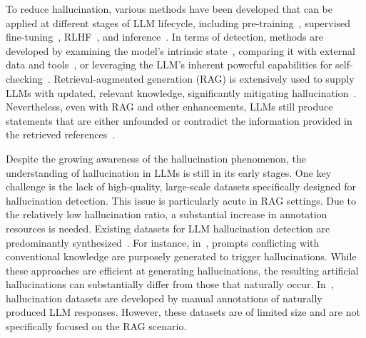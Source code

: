 \documentclass[11pt]{article}
\begin{document}



To reduce hallucination, various methods have been developed that can be applied at different stages of LLM lifecycle, including pre-training~\cite{brown2020language}, supervised fine-tuning~\cite{zhou2023lima,zhang2023r}, RLHF~\cite{ouyang2022training, lin-etal-2022-truthfulqa}, and inference~\cite{dhuliawala2023chainofverification, gao-etal-2023-rarr}. 
In terms of detection, methods are developed by examining the model's intrinsic state~\cite{guo2017calibration}, comparing it with external data and tools~\cite{chern2023factool}, or leveraging the LLM's inherent powerful capabilities for self-checking~\cite{agrawal2023language,Manakul2023-selfcheckgpt}. 
Retrieval-augmented generation (RAG) is extensively used to supply LLMs with updated, relevant knowledge, significantly mitigating hallucination~\cite{varshney2023stitch}. 
Nevertheless, even with RAG and other enhancements, LLMs still produce statements that are either unfounded or contradict the information provided in the retrieved references~\cite{shuster2021retrieval}.

Despite the growing awareness of the hallucination phenomenon, the understanding of hallucination in LLMs is still in its early stages. 
One key challenge is the lack of high-quality, large-scale datasets specifically designed for hallucination detection. 
This issue is particularly acute in RAG settings. 
Due to the relatively low hallucination ratio, a substantial increase in annotation resources is needed.
Existing datasets for LLM hallucination detection are predominantly synthesized~\cite{Li2023}. 
For instance, in~\citet{memotrap2023,longpre-etal-2021entity}, prompts conflicting with conventional knowledge are purposely generated to trigger hallucinations. 
While these approaches are efficient at generating hallucinations, the resulting artificial hallucinations can substantially differ from those that naturally occur.
In~\citet{chen2023felm, hu-etal-2023-bschecker}, hallucination datasets are developed by manual annotations of naturally produced LLM responses. However, these datasets are of limited size and are not specifically focused on the RAG scenario.
\end{document}
